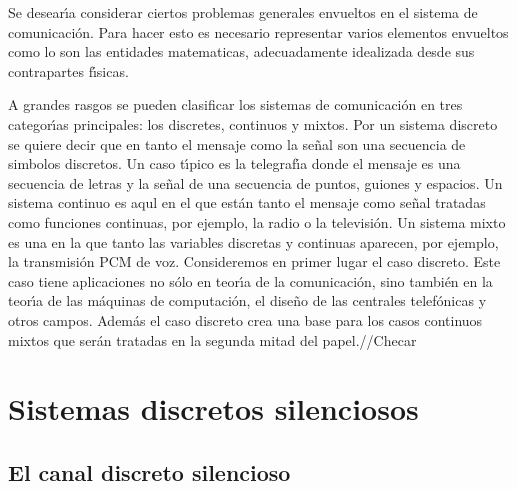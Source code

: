 Se desear\'{\i}a considerar ciertos problemas generales envueltos en
 el sistema de comunicaci\'{o}n. Para hacer esto es necesario
 representar varios elementos envueltos como lo son las entidades
 matematicas, adecuadamente idealizada desde sus contrapartes
 f\'{\i}sicas.


A grandes rasgos se pueden clasificar los sistemas de comunicaci\'{o}n
en tres categor\'{\i}as principales: los discretes, continuos y
mixtos. Por un sistema discreto se quiere decir que en tanto el
mensaje como la se\~{n}al son una secuencia de simbolos discretos. Un
caso t\'{\i}pico es la telegraf\'{\i}a donde el mensaje es una
secuencia de letras y la se\~{n}al de una secuencia de puntos, guiones
y espacios. Un sistema continuo es aqul en el que est\'{a}n tanto el
mensaje como se\~{n}al tratadas como funciones continuas, por ejemplo,
la radio o la televisi\'{o}n. Un sistema mixto es una en la que tanto
las variables discretas y continuas aparecen, por ejemplo, la
transmisi\'{o}n PCM de voz. Consideremos en primer lugar el caso
discreto. Este caso tiene aplicaciones no s\'{o}lo en teor\'{\i}a de
la comunicaci\'{o}n, sino tambi\'{e}n en la teor\'{\i}a de las
m\'{a}quinas de computaci\'{o}n, el dise\~{n}o de las centrales
telef\'{o}nicas y otros campos.  Adem\'{a}s el caso discreto crea una
base para los casos continuos mixtos que ser\'{a}n tratadas en la
segunda mitad del papel.//Checar

\chapter{Sistemas discretos silenciosos}

\section{El canal discreto silencioso}

